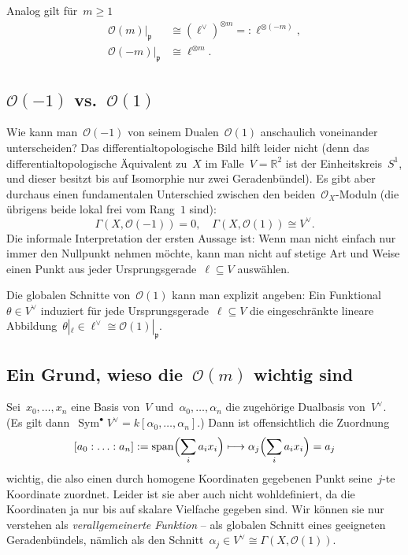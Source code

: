 \documentclass[a4paper,ngerman]{scrartcl}
\renewcommand{\O}{\mathcal{O}}
\DeclareMathOperator{\Span}{span}
\DeclareMathOperator{\Sym}{Sym}
\begin{document}
Analog gilt für~$m \geq 1$
\begin{align*}
  \O(m)|_\mathfrak{p} &\cong (\ell^\vee)^{\otimes m} =: \ell^{\otimes(-m)}, \\
  \O(-m)|_\mathfrak{p} &\cong \ell^{\otimes m}.
\end{align*}

\subsection*{$\O(-1)$ vs.~$\O(1)$}

Wie kann man~$\O(-1)$ von seinem Dualen~$\O(1)$ anschaulich voneinander unterscheiden? Das
differentialtopologische Bild hilft leider nicht (denn das
differentialtopologische Äquivalent zu~$X$ im Falle~$V = \mathbb{R}^2$ ist der
Einheitskreis~$S^1$, und dieser besitzt bis auf Isomorphie nur zwei Geradenbündel).
Es gibt aber durchaus einen fundamentalen Unterschied zwischen den
beiden~$\O_X$-Moduln (die übrigens beide lokal frei vom Rang~$1$ sind):
\[ \Gamma(X, \O(-1)) = 0, \quad \Gamma(X, \O(1)) \cong V^\vee. \]
Die informale Interpretation der ersten Aussage ist: Wenn man nicht einfach nur immer den
Nullpunkt nehmen möchte, kann man nicht auf stetige Art und Weise einen Punkt aus jeder
Ursprungsgerade~$\ell \subseteq V$ auswählen.

Die globalen Schnitte von~$\O(1)$ kann man explizit angeben: Ein Funktional~$\theta \in
V^\vee$ induziert für jede Ursprungsgerade~$\ell \subseteq V$ die
eingeschränkte lineare Abbildung~$\theta|_\ell \in \ell^\vee \cong
\O(1)|_\mathfrak{p}$.

\subsection*{Ein Grund, wieso die~$\O(m)$ wichtig sind}

Sei~$x_0,\ldots,x_n$ eine Basis von~$V$ und~$\alpha_0,\ldots,\alpha_n$ die
zugehörige Dualbasis von~$V^\vee$. (Es gilt dann~$\Sym^\bullet V^\vee =
k[\alpha_0,\ldots,\alpha_n]$.) Dann ist offensichtlich die Zuordnung
\[ [a_0:\ldots:a_n] := \Span\Bigl(\sum_i a_i x_i\Bigr) \longmapsto
  \alpha_j\Bigl(\sum_i a_i x_i\Bigr) = a_j \]
wichtig, die also einen durch homogene Koordinaten gegebenen Punkt seine~$j$-te
Koordinate zuordnet. Leider ist sie aber auch nicht wohldefiniert, da die
Koordinaten ja nur bis auf skalare Vielfache gegeben sind. Wir können
sie nur verstehen als \emph{verallgemeinerte Funktion} -- als globalen Schnitt
eines geeigneten Geradenbündels, nämlich als den Schnitt~$\alpha_j \in V^\vee
\cong \Gamma(X, \O(1))$.
\end{document}

